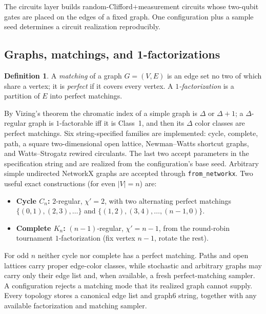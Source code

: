 \documentclass[11pt]{article}
\theoremstyle{definition}
\newtheorem{definition}{Definition}[section]
\theoremstyle{plain}
\begin{document}
The circuits layer builds random-Clifford$+$measurement circuits whose two-qubit
gates are placed on the edges of a fixed graph. One configuration plus a sample
seed determines a circuit realization reproducibly.

\subsection{Graphs, matchings, and 1-factorizations}
\begin{definition}
A \emph{matching} of a graph $G=(V,E)$ is an edge set no two of which share a
vertex; it is \emph{perfect} if it covers every vertex. A
\emph{$1$-factorization} is a partition of $E$ into perfect matchings.
\end{definition}
By Vizing's theorem the chromatic index of a simple graph is $\Delta$ or
$\Delta+1$; a $\Delta$-regular graph is $1$-factorable iff it is Class~1, and
then its $\Delta$ color classes are perfect matchings. Six string-specified
families are implemented: cycle, complete, path, a square two-dimensional open
lattice, Newman--Watts shortcut graphs, and Watts--Strogatz rewired circulants.
The last two accept parameters in the specification string and are realized
from the configuration's base seed. Arbitrary simple undirected NetworkX graphs
are accepted through \texttt{from\_networkx}. Two useful exact constructions
(for even $|V|=n$) are:
\begin{itemize}[leftmargin=1.5em]
\item \textbf{Cycle $C_n$:} $2$-regular, $\chi'=2$, with two alternating perfect
  matchings $\{(0,1),(2,3),\dots\}$ and $\{(1,2),(3,4),\dots,(n-1,0)\}$.
\item \textbf{Complete $K_n$:} $(n-1)$-regular, $\chi'=n-1$, from the round-robin
  tournament $1$-factorization (fix vertex $n-1$, rotate the rest).
\end{itemize}
For odd $n$ neither cycle nor complete has a perfect matching. Paths and open
lattices carry proper edge-color classes, while stochastic and arbitrary graphs
may carry only their edge list and, when available, a fresh perfect-matching
sampler. A configuration rejects a matching mode that its realized graph cannot
supply. Every topology stores a canonical edge list and graph6 string, together
with any available factorization and matching sampler.
\end{document}
